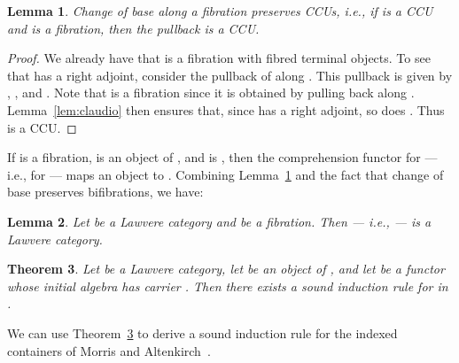 \documentclass{LMCS}
\theoremstyle{plain}
\newtheorem{theorem}{Theorem}[section]
\newtheorem{lemma}[theorem]{Lemma}
\theoremstyle{remark}
\theoremstyle{definition}
\begin{document}
\begin{lemma}\label{lem:pb-pres}
  Change of base along a fibration preserves CCUs, i.e., if  is a CCU and  is a fibration, then the pullback
   is a CCU.
\end{lemma}
\begin{proof}
  We already have that  is a fibration with fibred terminal
  objects. To see that  has a right adjoint, consider the
  pullback of  along .  This pullback is given by ,
  , and . Note that
   is a fibration since it is obtained by pulling  back
  along . Lemma~\ref{lem:claudio} then ensures that, since 
  has a right adjoint, so does . Thus  is a CCU.
\end{proof}

If  is a fibration,  is an object of , and 
is , then the comprehension functor for
 --- i.e., for  --- maps an object  to . Combining Lemma~\ref{lem:pb-pres} and the fact
that change of base preserves bifibrations, we have:

\begin{lemma}\label{lem:coblwfib}
  Let  be a Lawvere category and  be a
  fibration. Then  --- i.e.,  --- is a Lawvere category.
\end{lemma}
\noindent

\begin{theorem}\label{thm:iinda}
Let  be a Lawvere category, let  be an object of
, and let  be a functor whose initial algebra
has carrier . Then there exists a sound induction rule for  in .
\end{theorem}

We can use Theorem~\ref{thm:iinda} to derive a sound induction rule
for the indexed containers of Morris and Altenkirch~\cite{ma09}.
\end{document}

